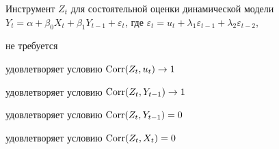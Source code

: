 
\begin{question}
Инструмент \(Z_t\) для состоятельной оценки динамической модели
\(Y_{t} =\alpha +\beta_0 X_t + \beta_1 Y_{t-1} + \varepsilon_t\), где
\(\varepsilon_t = u_t + \lambda_1 \varepsilon_{t-1} + \lambda_2 \varepsilon_{t-2}\),
\begin{answerlist}[2]
  \item не требуется
  \item удовлетворяет условию \(\operatorname{Corr}(Z_t, u_t) \to 1\)
  \item удовлетворяет условию \(\operatorname{Corr}(Z_t, Y_{t-1}) \to 1\)
  \item удовлетворяет условию \(\operatorname{Corr}(Z_t, Y_{t-1}) =0\)
  \item удовлетворяет условию \(\operatorname{Corr}(Z_t, X_t) =0\)
\end{answerlist}
\end{question}


